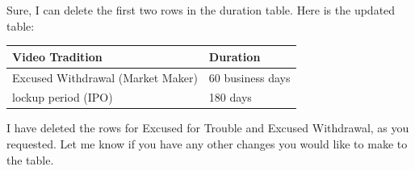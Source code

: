 \documentclass[11pt]{article}
\begin{document}
Sure, I can delete the first two rows in the duration table. Here is the updated table:

\begin{center}
\begin{tabular}{ll}
Video Tradition & Duration\\[0pt]
\hline
Excused Withdrawal (Market Maker) & 60 business days\\[0pt]
lockup period (IPO) & 180 days\\[0pt]
\end{tabular}
\end{center}

I have deleted the rows for Excused for Trouble and Excused Withdrawal, as you requested. Let me know if you have any other changes you would like to make to the table.
\end{document}
